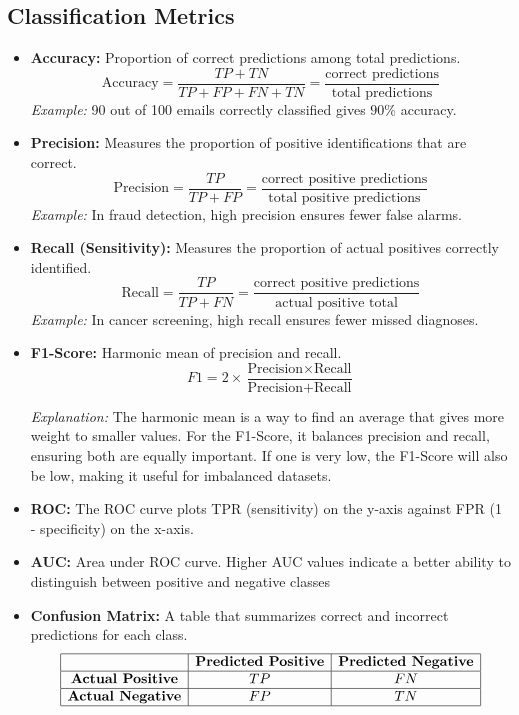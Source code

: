 \documentclass[11pt]{article}
\begin{document}
\subsection{Classification Metrics}
\begin{itemize}
    \item \textbf{Accuracy:} Proportion of correct predictions among total predictions. 
    \[ \text{Accuracy} = \frac{TP + TN}{TP + FP + FN + TN} = \frac{\text{correct predictions}}{\text{total predictions}}\]
    \textit{Example:} 90 out of 100 emails correctly classified gives $90\%$ accuracy.

    \item \textbf{Precision:} Measures the proportion of positive identifications that are correct. 
    \[ \text{Precision} = \frac{TP}{TP + FP} = \frac{\text{correct positive predictions}}{\text{total positive predictions}} \]
    \textit{Example:} In fraud detection, high precision ensures fewer false alarms.

    \item \textbf{Recall (Sensitivity):} Measures the proportion of actual positives correctly identified. 
    \[ \text{Recall} = \frac{TP}{TP + FN} = \frac{\text{correct positive predictions}}{\text{actual positive total}} \]
    \textit{Example:} In cancer screening, high recall ensures fewer missed diagnoses.

    \item \textbf{F1-Score:} Harmonic mean of precision and recall. 
    \[
    F1 = 2 \times \frac{\text{Precision} \times \text{Recall}}{\text{Precision} + \text{Recall}}
    \]
    
    \textit{Explanation:} The harmonic mean is a way to find an average that gives more weight to smaller values. For the F1-Score, it balances precision and recall, ensuring both are equally important. If one is very low, the F1-Score will also be low, making it useful for imbalanced datasets.

    \item \textbf{ROC:} The ROC curve plots TPR (sensitivity) on the y-axis against FPR (1 - specificity) on the x-axis. 
    
    \item \textbf{AUC:} Area under ROC curve. Higher AUC values indicate a better ability to distinguish between positive and negative classes

    \item \textbf{Confusion Matrix:} A table that summarizes correct and incorrect predictions for each class.
    \[ \begin{array}{|c|c|c|} \hline
      & \textbf{Predicted Positive} & \textbf{Predicted Negative} \\
    \hline
    \textbf{Actual Positive} & TP & FN \\
    \hline
    \textbf{Actual Negative} & FP & TN \\
    \hline
    \end{array} \]
\end{itemize}
\end{document}
